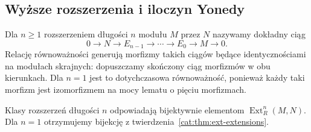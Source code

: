 \subsection{Wyższe rozszerzenia i iloczyn Yonedy}
\begin{definicja}\label{cat:def:yoneda-extension}
Dla $n\ge1$ rozszerzeniem długości $n$ modułu $M$ przez $N$ nazywamy dokładny ciąg
\[
 0\to N\to E_{n-1}\to\cdots\to E_0\to M\to0.
\]
Relację równoważności generują morfizmy takich ciągów będące identycznościami na modułach skrajnych: dopuszczamy skończony ciąg morfizmów w obu kierunkach. Dla $n=1$ jest to dotychczasowa równoważność, ponieważ każdy taki morfizm jest izomorfizmem na mocy lematu o pięciu morfizmach.
\end{definicja}
\begin{twierdzenie}\label{cat:thm:yoneda-extensions}
Klasy rozszerzeń długości $n$ odpowiadają bijektywnie elementom $\operatorname{Ext}_R^n(M,N)$. Dla $n=1$ otrzymujemy bijekcję z twierdzenia~\ref{cat:thm:ext-extensions}.
\end{twierdzenie}
